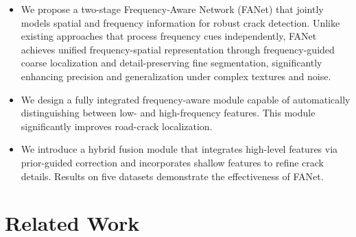 \documentclass[journal]{IEEEtran}
\begin{document}
\begin{itemize}
    
    
    \item We propose a two-stage Frequency-Aware Network (FANet) that jointly models spatial and frequency information for robust crack detection. 
    Unlike existing approaches that process frequency cues independently, FANet achieves unified frequency-spatial representation through frequency-guided coarse localization and detail-preserving fine segmentation, 
    significantly enhancing precision and generalization under complex textures and noise.

    \item We design a fully integrated frequency-aware module capable of automatically distinguishing between low- and high-frequency features. This module significantly improves road-crack localization.
    
    \item We introduce a hybrid fusion module that integrates high-level features via prior-guided correction and incorporates shallow features to refine crack details. Results on five datasets demonstrate the effectiveness of FANet.
    
\end{itemize}


\section{Related Work}\label{sec2}
\end{document}
